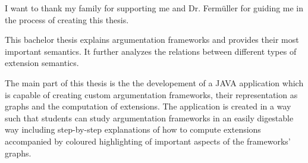 \documentclass[draft,final]{vutinfth} %
\newcommand{\hl}{\par\vspace{6pt}} %
\begin{document}
\frontmatter %

\addstatementpage

\begin{acknowledgements*}
I want to thank my family for supporting me and Dr. Ferm{\"u}ller for guiding me in the process of creating this thesis.
\end{acknowledgements*}

\begin{abstract*}
This bachelor thesis explains argumentation frameworks and provides their most important semantics. It further analyzes the relations between different types of extension semantics.\hl
The main part of this thesis is the the developement of a JAVA application which is capable of creating custom argumentation frameworks, their representation as graphs and the computation of extensions. The application is created in a way such that students can study argumentation frameworks in an easily digestable way including step-by-step explanations of how to compute extensions accompanied by coloured highlighting of important aspects of the frameworks' graphs.
\end{abstract*}


\tableofcontents* %

\mainmatter
\end{document}
